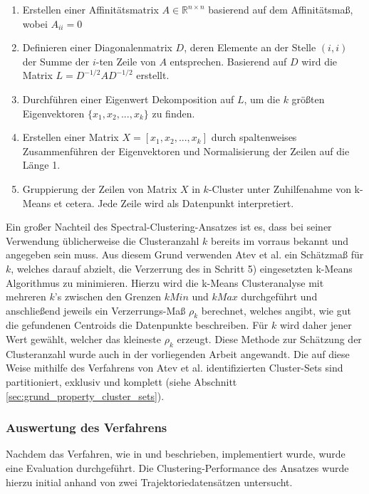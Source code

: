 \begin{enumerate}
    \item Erstellen einer Affinitätsmatrix $A \in \mathbb{R}^{n \times n}$ basierend auf dem Affinitätsmaß, wobei $A_{ii} = 0$
    \item Definieren einer Diagonalenmatrix $D$, deren Elemente an der Stelle $(i,i)$ der Summe der $i$-ten
            Zeile von $A$ entsprechen. Basierend auf $D$ wird die Matrix $L = D^{-1/2} AD^{-1/2}$ erstellt.
    \item Durchführen einer Eigenwert Dekomposition auf $L$, um die $k$ größten Eigenvektoren
            $\{x_1, x_2, ..., x_k\}$ zu finden.
    \item Erstellen einer Matrix $X = [x_1, x_2,..., x_k]$ durch spaltenweises Zusammenführen der Eigenvektoren und
            Normalisierung der Zeilen auf die Länge 1.
    \item Gruppierung der Zeilen von Matrix $X$ in $k$-Cluster unter Zuhilfenahme von k-Means et cetera.
            Jede Zeile wird als Datenpunkt interpretiert.
\end{enumerate}

Ein großer Nachteil des Spectral-Clustering-Ansatzes ist es, dass bei seiner Verwendung üblicherweise die Clusteranzahl $k$
bereits im vorraus bekannt und angegeben sein muss. Aus diesem Grund verwenden Atev et al. ein Schätzmaß für
$k$, welches darauf abzielt, die Verzerrung des in Schritt 5) eingesetzten k-Means Algorithmus zu minimieren.
Hierzu wird die k-Means Clusteranalyse mit mehreren $k$'s zwischen den Grenzen $kMin$ und $kMax$ durchgeführt
und anschließend jeweils ein Verzerrungs-Maß $\rho_k$ berechnet, welches angibt, wie gut die gefundenen Centroids
die Datenpunkte beschreiben. Für $k$ wird daher jener Wert gewählt, welcher das
kleineste $\rho_k$ erzeugt. Diese Methode zur Schätzung der Clusteranzahl wurde auch in der vorliegenden
Arbeit angewandt.
Die auf diese Weise mithilfe des Verfahrens von Atev et al. identifizierten Cluster-Sets sind partitioniert,
exklusiv und komplett (siehe Abschnitt \ref{sec:grund_property_cluster_sets}).

\subsubsection{Auswertung des Verfahrens}

Nachdem das Verfahren, wie in \cite[]{Atev2006} und \cite[]{Ng2002} beschrieben, implementiert wurde,
wurde eine Evaluation durchgeführt. Die Clustering-Performance des Ansatzes
wurde hierzu initial anhand von zwei Trajektoriedatensätzen untersucht.

